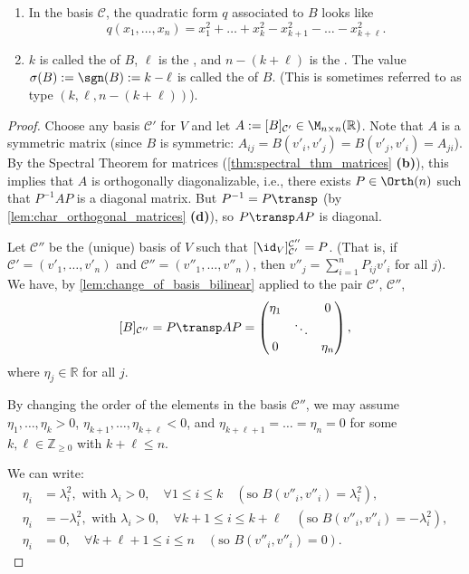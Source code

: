 \begin{remark}
\leavevmode
\begin{enumerate}[label=\textbf{(\alph*)}]
    \item In the basis $\mathcal{C}$, the quadratic form $q$ associated to $B$ looks like 
    \[ q(x_1, \dots, x_n) = x_1^2 + \dots + x_k^2 - x_{k+1}^2 - \dots - x_{k+\ell}^2. \]
    \item $k$ is called the  of $B$, $\ell$ is the , and $n - (k + \ell)$ is the . The value $\sigma(B) := \sgn(B) := k - \ell$ is called the  of $B$. (This is sometimes referred to as type $(k, \ell, n - (k + \ell))$).
\end{enumerate}
\end{remark}

\begin{proof}
Choose any basis $\mathcal{C}'$ for $V$ and let $A := [B]_{\mathcal{C}'} \in \M_{n \times n}(\mathbb{R})$. Note that $A$ is a symmetric matrix (since $B$ is symmetric: $A_{ij} = B(v'_i, v'_j) = B(v'_j, v'_i) = A_{ji}$). By the Spectral Theorem for matrices (\cref{thm:spectral_thm_matrices} \textbf{(b)}), this implies that $A$ is orthogonally diagonalizable, i.e., there exists $P \in \Orth(n)$ such that $P^{-1} A P$ is a diagonal matrix. But $P^{-1} = P\transp$ (by \cref{lem:char_orthogonal_matrices} \textbf{(d)}), so $P\transp A P$ is diagonal.

Let $\mathcal{C}''$ be the (unique) basis of $V$ such that $[\id_V]_{\mathcal{C}'}^{\mathcal{C}''} = P$. (That is, if $\mathcal{C}' = (v'_1, \dots, v'_n)$ and $\mathcal{C}'' = (v''_1, \dots, v''_n)$, then $v''_j = \sum_{i=1}^n P_{ij} v'_i$ for all $j$).
We have, by \cref{lem:change_of_basis_bilinear} applied to the pair $\mathcal{C}'$, $\mathcal{C}''$,
\[
[B]_{\mathcal{C}''} = P\transp A P = \begin{pmatrix} \eta_1 & & 0 \\ & \ddots & \\ 0 & & \eta_n \end{pmatrix},
\]
where $\eta_j \in \mathbb{R}$ for all $j$.

By changing the order of the elements in the basis $\mathcal{C}''$, we may assume $\eta_1, \dots, \eta_k > 0$, $\eta_{k+1}, \dots, \eta_{k+\ell} < 0$, and $\eta_{k+\ell+1} = \dots = \eta_n = 0$ for some $k, \ell \in \mathbb{Z}_{\ge 0}$ with $k + \ell \le n$.

We can write:
\begin{align*}
\eta_i &= \lambda_i^2, \text{ with } \lambda_i > 0, \quad \forall 1 \le i \le k \quad (\text{so } B(v''_i, v''_i) = \lambda_i^2), \\
\eta_i &= -\lambda_i^2, \text{ with } \lambda_i > 0, \quad \forall k+1 \le i \le k+\ell \quad (\text{so } B(v''_i, v''_i) = -\lambda_i^2), \\
\eta_i &= 0, \quad \forall k+\ell+1 \le i \le n \quad (\text{so } B(v''_i, v''_i) = 0).
\end{align*}


\end{proof}
